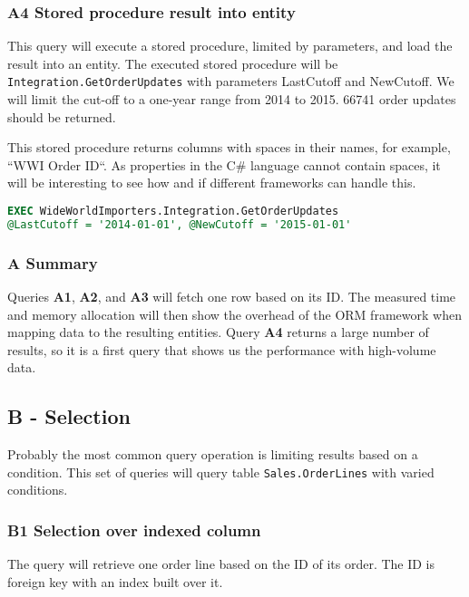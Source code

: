 \subsubsection*{A4 Stored procedure result into entity}
This query will execute a stored procedure, limited by parameters, and load the result into an entity.
The executed stored procedure will be \texttt{Integration.GetOrderUpdates} with parameters LastCutoff and NewCutoff. 
We will limit the cut-off to a one-year range from 2014 to 2015. 66741 order updates should be returned.

This stored procedure returns columns with spaces in their names, for example, ``WWI Order ID``. As properties in the C\# language cannot contain spaces, it will be interesting to see how and if different frameworks can handle this.

\begin{lstlisting}[language=SQL]
EXEC WideWorldImporters.Integration.GetOrderUpdates 
@LastCutoff = '2014-01-01', @NewCutoff = '2015-01-01'
\end{lstlisting}

\subsubsection*{A Summary}
Queries \textbf{A1}, \textbf{A2}, and \textbf{A3} will fetch one row based on its ID. The measured time and memory allocation will then show the overhead of the ORM framework when mapping data to the resulting entities. Query \textbf{A4} returns a large number of results, so it is a first query that shows us the performance with high-volume data.

\subsection{B - Selection}
Probably the most common query operation is limiting results based on a condition. This set of queries will query table \texttt{Sales.OrderLines} with varied conditions.

\subsubsection*{B1 Selection over indexed column}
The query will retrieve one order line based on the ID of its order. The ID is foreign key with an index built over it.

